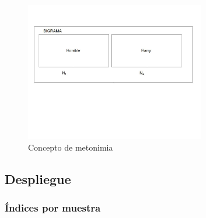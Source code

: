 \documentclass[twoside]{article}
\begin{document}
\begin{enumerate}
\begin{figure}[!H]
\centering
\includegraphics[width=0.7\textwidth]{./assets/metonimia.jpg}
\caption{\label{fig:metonimia}Concepto de metonimia}
\end{figure}
\end{enumerate}
\subsection{Despliegue}
\label{sec:orgc30ca78}

\subsubsection{Índices por muestra}
\label{sec:orgd75fd10}
\end{document}
